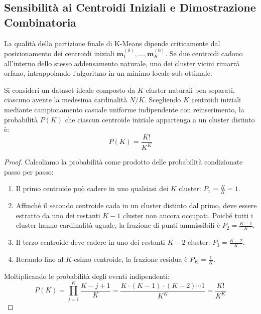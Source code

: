 \subsection{Sensibilità ai Centroidi Iniziali e Dimostrazione Combinatoria}

La qualità della partizione finale di K-Means dipende criticamente dal posizionamento dei centroidi iniziali $\mathbf{m}_1^{(0)}, \dots, \mathbf{m}_K^{(0)}$. Se due centroidi cadono all'interno dello stesso addensamento naturale, uno dei cluster vicini rimarrà orfano, intrappolando l'algoritmo in un minimo locale sub-ottimale.

\begin{theorem}
Si consideri un dataset ideale composto da $K$ cluster naturali ben separati, ciascuno avente la medesima cardinalità $N/K$. Scegliendo $K$ centroidi iniziali mediante campionamento casuale uniforme indipendente con reinserimento, la probabilità $P(K)$ che ciascun centroide iniziale appartenga a un cluster distinto è:
\begin{equation}
    P(K) = \frac{K!}{K^K}
    \label{eq:dm-init-prob-formula}
\end{equation}
\end{theorem}

\begin{proof}
Calcoliamo la probabilità come prodotto delle probabilità condizionate passo per passo:
\begin{enumerate}
    \item Il primo centroide può cadere in uno qualsiasi dei $K$ cluster: $P_1 = \frac{K}{K} = 1$.
    \item Affinché il secondo centroide cada in un cluster distinto dal primo, deve essere estratto da uno dei restanti $K-1$ cluster non ancora occupati. Poiché tutti i cluster hanno cardinalità uguale, la frazione di punti ammissibili è $P_2 = \frac{K-1}{K}$.
    \item Il terzo centroide deve cadere in uno dei restanti $K-2$ cluster: $P_3 = \frac{K-2}{K}$.
    \item Iterando fino al $K$-esimo centroide, la frazione residua è $P_K = \frac{1}{K}$.
\end{enumerate}
Moltiplicando le probabilità degli eventi indipendenti:
\begin{equation}
    P(K) = \prod_{j=1}^K \frac{K - j + 1}{K} = \frac{K \cdot (K-1) \cdot (K-2) \cdots 1}{K^K} = \frac{K!}{K^K}
\end{equation}
\end{proof}

